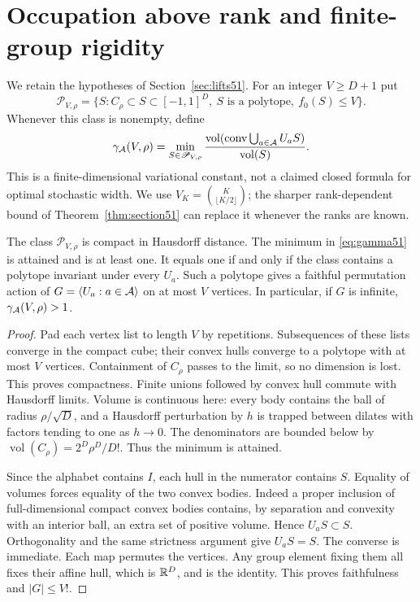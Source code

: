 \section{Occupation above rank and finite-group rigidity}\label{sec:rigidity51}
We retain the hypotheses of Section~\ref{sec:lifts51}. For an integer
$V\ge D+1$ put
\[
 \mathscr P_{V,\rho}=\{S:C_\rho\subset S\subset[-1,1]^D,
                  \ S\text{ is a polytope},\ f_0(S)\le V\}.
\]
Whenever this class is nonempty, define
\begin{equation}\label{eq:gamma51}
 \gamma_{\mathcal A}(V,\rho)=
 \min_{S\in\mathscr P_{V,\rho}}
 \frac{\operatorname{vol}(\operatorname{conv}\bigcup_{a\in\mathcal A}U_aS)}
      {\operatorname{vol}(S)}.
\end{equation}
This is a finite-dimensional variational constant, not a claimed
closed formula for optimal stochastic width. We use
$V_K=\binom{K}{\lfloor K/2\rfloor}$; the sharper rank-dependent
bound of Theorem~\ref{thm:section51} can replace it whenever the ranks
are known.

\begin{lemma}\label{lem:compact51}
The class $\mathscr P_{V,\rho}$ is compact in Hausdorff distance.
The minimum in \eqref{eq:gamma51} is attained and is at least one.
It equals one if and only if the class contains a polytope invariant
under every $U_a$. Such a polytope gives a faithful permutation action
of $G=\langle U_a:a\in\mathcal A\rangle$ on at most $V$ vertices.
In particular, if $G$ is infinite, $\gamma_{\mathcal A}(V,\rho)>1$.
\end{lemma}
\begin{proof}
Pad each vertex list to length $V$ by repetitions. Subsequences of
these lists converge in the compact cube; their convex hulls converge
to a polytope with at most $V$ vertices. Containment of $C_\rho$
passes to the limit, so no dimension is lost. This proves compactness.
Finite unions followed by convex hull commute with Hausdorff limits.
Volume is continuous here: every body contains the ball of radius
$\rho/\sqrt D$, and a Hausdorff perturbation by $h$ is trapped
between dilates with factors tending to one as $h\to0$.
The denominators are bounded below by
$\operatorname{vol}(C_\rho)=2^D\rho^D/D!$. Thus the minimum is attained.

Since the alphabet contains $I$, each hull in the numerator contains
$S$. Equality of volumes forces equality of the two convex bodies.
Indeed a proper inclusion of full-dimensional compact convex bodies
contains, by separation and convexity with an interior ball, an extra
set of positive volume. Hence $U_aS\subset S$. Orthogonality and the
same strictness argument give $U_aS=S$. The converse is immediate.
Each map permutes the vertices. Any group element fixing them all
fixes their affine hull, which is $\mathbb R^D$, and is the identity. This
proves faithfulness and $|G|\le V!$.
\end{proof}

